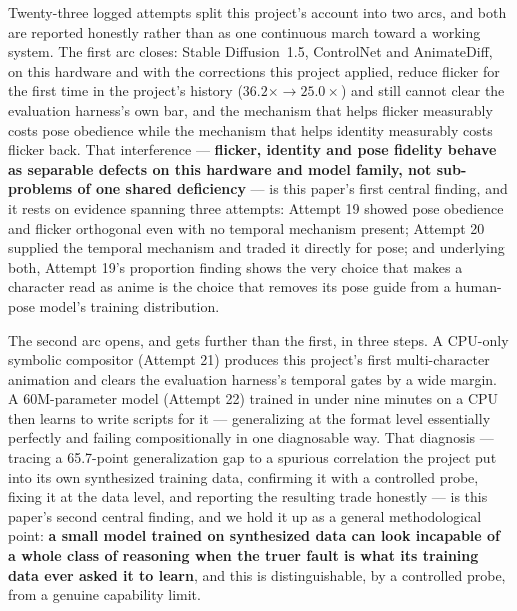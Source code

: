 \documentclass[11pt]{article}
\begin{document}
Twenty-three logged attempts split this project's account into two arcs,
and both are reported honestly rather than as one continuous march toward
a working system. The first arc closes: Stable Diffusion~1.5, ControlNet
and AnimateDiff, on this hardware and with the corrections this project
applied, reduce flicker for the first time in the project's history
($36.2\times \rightarrow 25.0\times$) and still cannot clear the
evaluation harness's own bar, and the mechanism that helps flicker
measurably costs pose obedience while the mechanism that helps identity
measurably costs flicker back. That interference --- \textbf{flicker,
identity and pose fidelity behave as separable defects on this hardware
and model family, not sub-problems of one shared deficiency} --- is this
paper's first central finding, and it rests on evidence spanning three
attempts: Attempt 19 showed pose obedience and flicker orthogonal even
with no temporal mechanism present; Attempt 20 supplied the temporal
mechanism and traded it directly for pose; and underlying both, Attempt
19's proportion finding shows the very choice that makes a character read
as anime is the choice that removes its pose guide from a human-pose
model's training distribution.

The second arc opens, and gets further than the first, in three steps. A
CPU-only symbolic compositor (Attempt 21) produces this project's first
multi-character animation and clears the evaluation harness's temporal
gates by a wide margin. A 60M-parameter model (Attempt 22) trained in
under nine minutes on a CPU then learns to write scripts for it ---
generalizing at the format level essentially perfectly and failing
compositionally in one diagnosable way. That diagnosis --- tracing a
65.7-point generalization gap to a spurious correlation the project put
into its own synthesized training data, confirming it with a controlled
probe, fixing it at the data level, and reporting the resulting trade
honestly --- is this paper's second central finding, and we hold it up as
a general methodological point: \textbf{a small model trained on
synthesized data can look incapable of a whole class of reasoning when
the truer fault is what its training data ever asked it to learn}, and
this is distinguishable, by a controlled probe, from a genuine capability
limit.
\end{document}

